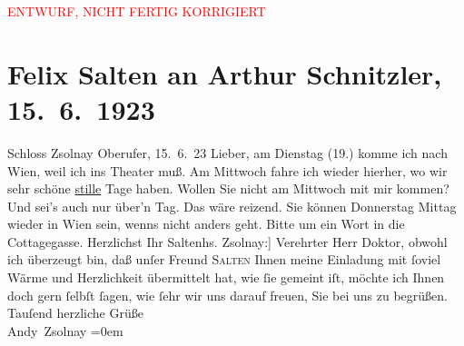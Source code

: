 
\begin{center}
            \textcolor{red}{ENTWURF, NICHT FERTIG KORRIGIERT}
                      \end{center}
            
         
         \renewcommand{\erwaehntePersonen}{Personen: Frieda Pollak}
         \renewcommand{\erwaehnteOrte}{Orte: Cottagegasse, Prievoz, Schloss Csáky, Wien}
         \renewcommand{\erwaehnteWerke}{}
               \section[Felix Salten an Arthur Schnitzler, 15. 6. 1923]{ Felix Salten an Arthur Schnitzler, 15. 6. 1923}\nopagebreak{}\rehead{ }\begin{ledgroupsized}[t]{13cm}\normalsize\beginnumbering \toendnotes[C]{\smallbreak\pagebreak[2]} 
\pstart
           \noindent{}\centering{}{\pb}{[}Schloss
                     Zsolnay\oindex{Schloss Csáky@\textbf{Schloss Csáky}|pw}{]}\pend
           \pstart
           {\pb}Oberufer, 15. 6. 23\pend
           \pstart{}Lieber,\pend\pstart
           am Dienstag (19.) komme ich nach Wien, weil ich ins Theater muß. Am Mittwoch fahre ich wieder
               hierher, wo wir sehr schöne \uline{stille} Tage haben. Wollen
               Sie nicht am Mittwoch mit mir kommen? Und sei’s auch nur über’n Tag. Das
               wäre reizend. Sie können Donnerstag Mittag wieder in Wien sein, wenns nicht anders geht. Bitte um ein Wort in die Cottagegasse. \pend
           \pstart Herzlichst Ihr \spacefill\mbox{Salten}\pend{}{\bigskip}\pstart{}{[}hs. Zsolnay:{]} Verehrter Herr Doktor,\pend\pstart
           obwohl ich überzeugt bin, daß unſer Freund \textsc{Salten} Ihnen
               meine Einladung mit ſoviel Wärme und Herzlichkeit übermittelt hat, wie ſie gemeint
               iſt, möchte ich Ihnen doch gern ſelbſt ſagen, wie ſehr {\pb}wir uns darauf freuen, Sie bei
               uns zu begrüßen. \pend
           \pstart
           Tauſend herzliche Grüße {\\[\baselineskip]}\spacefill\mbox{Andy Zsolnay}\pend
           \leftskip=0em{}
         

\end{ledgroupsized}
